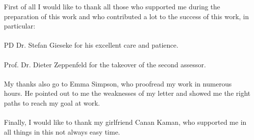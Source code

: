 
First of all I would like to thank all those who supported me during the preparation of this work and who contributed a lot to the success of this work, in particular:\\
\\
PD Dr. Stefan Gieseke for his excellent care and patience.\\
\\
Prof. Dr. Dieter Zeppenfeld for the takeover of the second assessor.\\
\\
My thanks also go to Emma Simpson, who proofread my work in numerous hours. He pointed out to me the weaknesses of my letter and showed me the right paths to reach my goal at work.\\
\\ 
Finally, I would like to thank my girlfriend Canan Kaman, who supported me in all things in this not always easy time.\\


 
         

